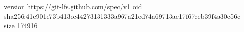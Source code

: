 version https://git-lfs.github.com/spec/v1
oid sha256:41c901e73b413ec44273131333a967a21ed74a69713ae17f67ceb39f4a30c56c
size 174916

